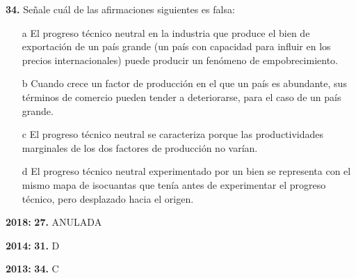 \documentclass{nuevotema}
\begin{document}

\textbf{34.} Señale cuál de las afirmaciones siguientes es falsa:

\begin{itemize}
	\item[a] El progreso técnico neutral en la industria que produce el bien de exportación de un país grande (un país con capacidad para influir en los precios internacionales) puede producir un fenómeno de empobrecimiento.
	\item[b] Cuando crece un factor de producción en el que un país es abundante, sus términos de comercio pueden tender a deteriorarse, para el caso de un país grande.
	\item[c] El progreso técnico neutral se caracteriza porque las productividades marginales de los dos factores de producción no varían.
	\item[d] El progreso técnico neutral experimentado por un bien se representa con el mismo mapa de isocuantas que tenía antes de experimentar el progreso técnico, pero desplazado hacia el origen.
\end{itemize}

\notas

\textbf{2018:} \textbf{27.} ANULADA

\textbf{2014:} \textbf{31.} D

\textbf{2013:} \textbf{34.} C

\bibliografia
\end{document}
